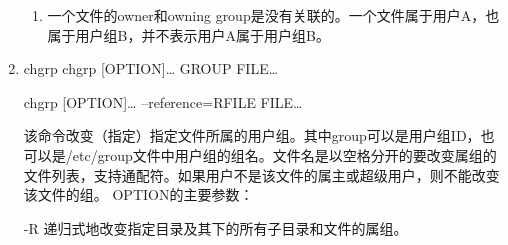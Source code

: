\documentclass[11pt]{article}
\begin{document}
\begin{enumerate}
\begin{enumerate}
\item 一个文件的owner和owning group是没有关联的。一个文件属于用户A，也属于用户组B，并不表示用户A属于用户组B。
\end{enumerate}

\item chgrp
\label{sec-1-1-3-4}
chgrp [OPTION]\ldots{} GROUP FILE\ldots{}

chgrp [OPTION]\ldots{} --reference=RFILE FILE\ldots{}

该命令改变（指定）指定文件所属的用户组。其中group可以是用户组ID，也可以是/etc/group文件中用户组的组名。文件名是以空格分开的要改变属组的文件列表，支持通配符。如果用户不是该文件的属主或超级用户，则不能改变该文件的组。 
OPTION的主要参数： 

-R 递归式地改变指定目录及其下的所有子目录和文件的属组。
\end{enumerate}
\end{document}
